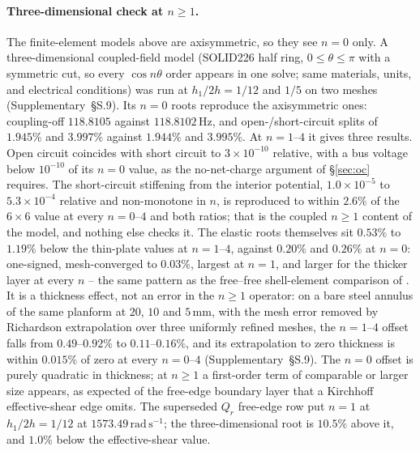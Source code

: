 \documentclass[11pt]{article}
\begin{document}
\paragraph{Three-dimensional check at $n\ge1$.} The finite-element
models above are axisymmetric, so they see $n=0$ only. A
three-dimensional coupled-field model (SOLID226 half ring,
$0\le\theta\le\pi$ with a symmetric cut, so every $\cos n\theta$ order
appears in one solve; same materials, units, and electrical conditions)
was run at $h_1/2h=1/12$ and $1/5$ on two meshes
(Supplementary~\S S.9). Its $n=0$ roots reproduce the axisymmetric
ones: coupling-off $118.8105$ against $118.8102\,\mathrm{Hz}$, and
open-/short-circuit splits of $1.945\%$ and $3.997\%$ against
$1.944\%$ and $3.995\%$. At $n=1$--$4$ it gives three results. Open
circuit coincides with short circuit to $3\times10^{-10}$ relative, with a bus
voltage below $10^{-10}$ of its $n=0$ value, as the no-net-charge
argument of \S\ref{sec:oc} requires. The short-circuit stiffening from
the interior potential, $1.0\times10^{-5}$ to $5.3\times10^{-4}$
relative and non-monotone in $n$, is reproduced to within $2.6\%$ of
the $6\times6$ value at every $n=0$--$4$ and both ratios; that is the
coupled $n\ge1$ content of the model, and nothing else checks it. The
elastic roots themselves sit $0.53\%$ to $1.19\%$ below the thin-plate
values at $n=1$--$4$, against $0.20\%$ and $0.26\%$ at $n=0$: one-signed,
mesh-converged to $0.03\%$, largest at $n=1$, and larger for the
thicker layer at every $n$ -- the same pattern as the free--free
shell-element comparison of \cite{mccune2026ring}. It is a thickness
effect, not an error in the $n\ge1$ operator: on a bare steel annulus of
the same planform at $20$, $10$ and $5\,\mathrm{mm}$, with the mesh
error removed by Richardson extrapolation over three uniformly refined
meshes, the $n=1$--$4$ offset falls from $0.49$--$0.92\%$ to
$0.11$--$0.16\%$, and its extrapolation to zero thickness is within
$0.015\%$ of zero at every $n=0$--$4$ (Supplementary~\S S.9). The $n=0$
offset is purely quadratic in thickness; at $n\ge1$ a first-order term
of comparable or larger size appears, as expected of the free-edge
boundary layer that a Kirchhoff effective-shear edge omits. The superseded $Q_r$ free-edge row put $n=1$ at
$h_1/2h=1/12$ at $1573.49\,\mathrm{rad\,s^{-1}}$; the three-dimensional
root is $10.5\%$ above it, and $1.0\%$ below the effective-shear value.
\end{document}
